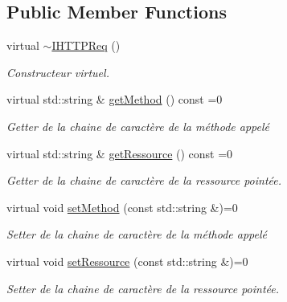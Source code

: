 \subsection*{Public Member Functions}
\begin{DoxyCompactItemize}
\item 
\hypertarget{class_a_p_i_tree_friends_1_1_i_h_t_t_p_req_a9682bba24f56637dae9e4503df00d55c}{}virtual \hyperlink{class_a_p_i_tree_friends_1_1_i_h_t_t_p_req_a9682bba24f56637dae9e4503df00d55c}{$\sim$\+I\+H\+T\+T\+P\+Req} ()\label{class_a_p_i_tree_friends_1_1_i_h_t_t_p_req_a9682bba24f56637dae9e4503df00d55c}

\begin{DoxyCompactList}\small\item\em Constructeur virtuel. \end{DoxyCompactList}\item 
virtual std\+::string \& \hyperlink{class_a_p_i_tree_friends_1_1_i_h_t_t_p_req_ab764c8212ee9ab3874b7a032570a646d}{get\+Method} () const =0
\begin{DoxyCompactList}\small\item\em Getter de la chaine de caractère de la méthode appelé \end{DoxyCompactList}\item 
virtual std\+::string \& \hyperlink{class_a_p_i_tree_friends_1_1_i_h_t_t_p_req_a335fac16ff7cd39e4e71fcee4746ab7a}{get\+Ressource} () const =0
\begin{DoxyCompactList}\small\item\em Getter de la chaine de caractère de la ressource pointée. \end{DoxyCompactList}\item 
virtual void \hyperlink{class_a_p_i_tree_friends_1_1_i_h_t_t_p_req_aac1dc7d564385881fcf663a4148b29cf}{set\+Method} (const std\+::string \&)=0
\begin{DoxyCompactList}\small\item\em Setter de la chaine de caractère de la méthode appelé \end{DoxyCompactList}\item 
virtual void \hyperlink{class_a_p_i_tree_friends_1_1_i_h_t_t_p_req_a556b11dc94bae1e9160d4df151c2469d}{set\+Ressource} (const std\+::string \&)=0
\begin{DoxyCompactList}\small\item\em Setter de la chaine de caractère de la ressource pointée. \end{DoxyCompactList}\end{DoxyCompactItemize}


